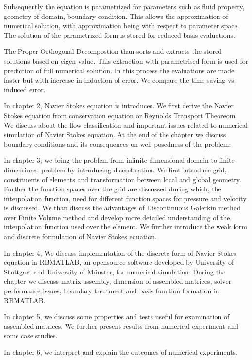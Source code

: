 \documentclass[a4paper,10pt]{book}
\begin{document}
Subsequently the equation is parametrized for parameters such as fluid property, geometry of domain, boundary condition. This allows the approximation of numerical solution, with approximation being with respect to parameter space. The solution of the parametrized form is stored for reduced basis evaluations.

The Proper Orthogonal Decompostion than sorts and extracts the stored  solutions based on eigen value. This extraction with parametrised form is used for prediction of full numerical solution. In this process the evaluations are made faster but with increase in induction of error. We compare the time saving vs. induced error.

In chapter 2, Navier Stokes equation is introduces. We first derive the Navier Stokes equation from conservation equation or Reynolds Transport Theoreom. We discuss about the flow classification and important issues related to numerical simulation of Navier Stokes equation. At the end of the chapter we discuss boundary conditions and its consequences on well posedness of the problem.

In chapter 3, we bring the problem from infinite dimensional domain to finite dimensional problem by introducing discretisation. We first introduce grid, constituents of elements and transformation between local and global geometry. Further the function spaces over the grid are discussed during which, the interpolation function, need for different function spaces for pressure and velocity is discussed. We than discuss the advantages of Discontinuous Galerkin method over Finite Volume method and develop more detailed understanding of the interpolation function used over the element. We further introduce the weak form and discrete formulation of Navier Stokes equation.

In chapter 4, We discuss implementation of the discrete form of Navier Stokes equation in RBMATLAB, an opensource software developed by University of Stuttgart and University of Münster, for numerical simulation. During the chapter we discuss matrix assembly, dimension of assembled matrices, solver performance issues, boundary treatment and basis function formation in RBMATLAB.

In chapter 5, we discuss some properties and tests useful for examination of assembled matrices. We further present results from numerical experiment and some case studies.

In chapter 6, we interpret and explain the outcomes of numerical experiments. 
\end{document}
